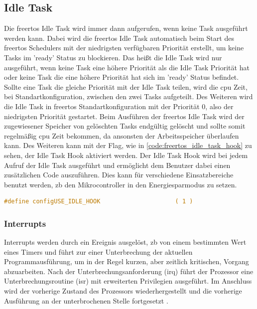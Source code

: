 \documentclass[../EDF Master Thesis.tex]{subfiles}
\begin{document}
\subsection{Idle Task} \label{section:idle_task}
Die \ac{freertos} Idle Task wird immer dann aufgerufen, wenn keine Task ausgeführt werden kann.
Dabei wird die \ac{freertos} Idle Task automatisch beim Start des \ac{freertos} Schedulers mit der niedrigsten verfügbaren Priorität erstellt, um keine Tasks im 'ready' Status zu blockieren.
Das heißt die Idle Task wird nur ausgeführt, wenn keine Task eine höhere Priorität als die Idle Task Priorität hat oder keine Task die eine höhere Priorität hat sich im 'ready' Status befindet.
Sollte eine Task die gleiche Priorität mit der Idle Task teilen, wird die \ac{cpu} Zeit, bei Standartkonfiguration, zwischen den zwei Tasks aufgeteilt.
Des Weiteren wird die Idle Task in \ac{freertos} Standartkonfiguration mit der Priorität 0, also der niedrigsten Priorität gestartet.
Beim Ausführen der \ac{freertos} Idle Task wird der zugewiesener Speicher von gelöschten Tasks endgültig gelöscht und sollte somit regelmäßig \ac{cpu} Zeit bekommen, da ansonsten der Arbeitsspeicher überlaufen kann.
Des Weiteren kann mit der Flag, wie in \autoref{code:freertos_idle_task_hook} zu sehen, der Idle Task Hook aktiviert werden.
Der Idle Task Hook wird bei jedem Aufruf der Idle Task ausgeführt und ermöglicht dem Benutzer dabei einen zusätzlichen Code auszuführen.
Dies kann für verschiedene Einsatzbereiche benutzt werden, \ac{zb} den Mikrocontroller in den Energiesparmodus zu setzen.

\begin{lstlisting}[language=C, caption=FreeRTOS Idle Task Hook, label=code:freertos_idle_task_hook]
    #define configUSE_IDLE_HOOK                     ( 1 )
\end{lstlisting}


\subsubsection{Interrupts} \label{section:interrupts}
Interrupts werden durch ein Ereignis ausgelöst, \ac{zb} von einem bestimmten Wert eines Timers und führt zur einer Unterbrechung der aktuellen Programmausführung, um in der Regel kurzen, aber zeitlich kritischen, Vorgang abzuarbeiten.
Nach der Unterbrechungsanforderung (\ac{irq}) führt der Prozessor eine Unterbrechungsroutine (\ac{isr}) mit erweiterten Privilegien ausgeführt.
Im Anschluss wird der vorherige Zustand des Prozessors wiederhergestellt und die vorherige Ausführung an der unterbrochenen Stelle fortgesetzt \parencite{wiki:008}.
\end{document}
